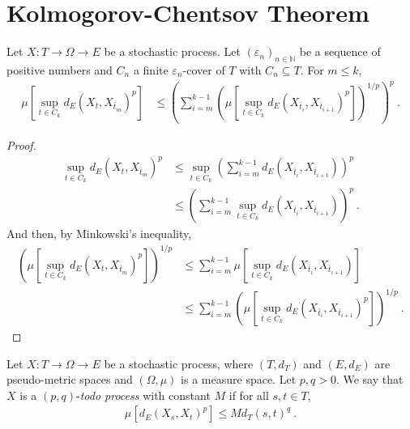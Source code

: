 \section{Kolmogorov-Chentsov Theorem}


\begin{lemma}\label{lem:integral_sup_dist_le_sum_rpow}
Let $X : T \to \Omega \to E$ be a stochastic process.
Let $(\varepsilon_n)_{n \in \mathbb{N}}$ be a sequence of positive numbers and $C_n$ a finite $\varepsilon_n$-cover of $T$ with $C_n \subseteq T$.
For $m \le k$,
\begin{align*}
  \mu \left[\sup_{t \in C_k} d_E(X_t, X_{\bar{t}_m})^p \right]
  &\le \left(\sum_{i=m}^{k-1} \left( \mu\left[\sup_{t \in C_k} d_E(X_{\bar{t}_i}, X_{\bar{t}_{i+1}})^p\right] \right)^{1/p}\right)^p
  \: .
\end{align*}
\end{lemma}

\begin{proof}
\begin{align*}
  \sup_{t \in C_k} d_E(X_t, X_{\bar{t}_m})^p
  &\le \sup_{t \in C_k} \left( \sum_{i=m}^{k-1} d_E(X_{\bar{t}_i}, X_{\bar{t}_{i+1}}) \right)^p
  \\
  &\le \left( \sum_{i=m}^{k-1} \sup_{t \in C_k} d_E(X_{\bar{t}_i}, X_{\bar{t}_{i+1}}) \right)^p
  \: .
\end{align*}
And then, by Minkowski's inequality,
\begin{align*}
  \left(\mu \left[\sup_{t \in C_k} d_E(X_t, X_{\bar{t}_m})^p \right]\right)^{1/p}
  &\le \sum_{i=m}^{k-1} \mu \left[\sup_{t \in C_k} d_E(X_{\bar{t}_i}, X_{\bar{t}_{i+1}}) \right]
  \\
  &\le \sum_{i=m}^{k-1} \left( \mu\left[\sup_{t \in C_k} d_E(X_{\bar{t}_i}, X_{\bar{t}_{i+1}})^p \right] \right)^{1/p}
  \: .
\end{align*}
\end{proof}


\begin{definition}\label{def:IsTodoProcess}
Let $X : T \to \Omega \to E$ be a stochastic process, where $(T, d_T)$ and $(E, d_E)$ are pseudo-metric spaces and $(\Omega, \mu)$ is a measure space.
Let $p, q > 0$.
We say that $X$ is a $(p,q)$-\emph{todo process} with constant $M$ if for all $s, t \in T$,
\begin{align*}
  \mu[d_E(X_s, X_t)^p] \le M d_T(s, t)^q
  \: .
\end{align*}
\end{definition}


